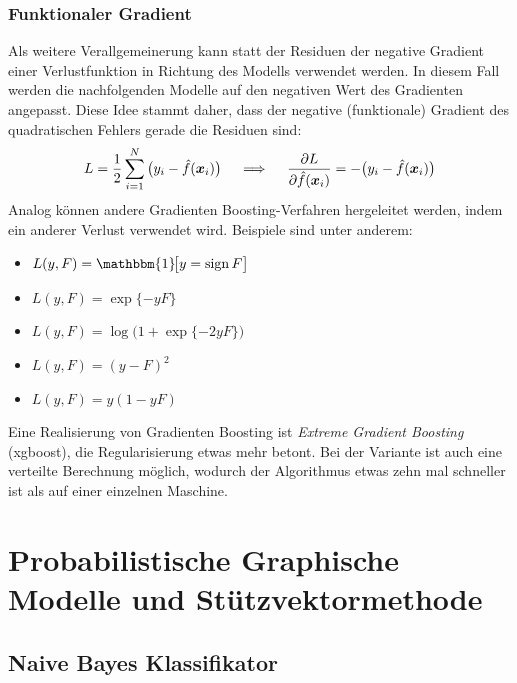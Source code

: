 		\subsection{Funktionaler Gradient}
			Als weitere Verallgemeinerung kann statt der Residuen der negative Gradient einer Verlustfunktion in Richtung des Modells verwendet werden. In diesem Fall werden die nachfolgenden Modelle auf den negativen Wert des Gradienten angepasst. Diese Idee stammt daher, dass der negative (funktionale) Gradient des quadratischen Fehlers gerade die Residuen sind:
			\begin{equation}
				L = \frac{1}{2} \sum_{i = 1}^{N} \big( y_i - \hat{f}(\bm{x}_i) \big)
				\quad\implies\quad
				\pdv{L}{\hat{f}(\bm{x}_i)} = -\big( y_i - \hat{f}(\bm{x}_i) \big)
			\end{equation}
			Analog können andere Gradienten Boosting-Verfahren hergeleitet werden, indem ein anderer Verlust verwendet wird. Beispiele sind unter anderem:
			\begin{itemize}
				\item {}    \( L(y, F) = \mathbbm{1}\!\big[ y = \sign F \big] \)
				\item {} \( L(y, F) = \exp\{ -yF \} \)
				\item {}              \( L(y, F) = \log\!\big(1 + \exp\{ -2yF \}\big) \)
				\item {}   \( L(y, F) = (y - F)^2 \)
				\item {}   \( L(y, F) = y (1 - yF) \)
			\end{itemize}
			Eine Realisierung von Gradienten Boosting ist \emph{Extreme Gradient Boosting} (xgboost), die Regularisierung etwas mehr betont. Bei der Variante ist auch eine verteilte Berechnung möglich, wodurch der Algorithmus etwas zehn mal schneller ist als auf einer einzelnen Maschine.

\chapter{Probabilistische Graphische Modelle und Stützvektormethode} %

	\section{Naive Bayes Klassifikator} %

